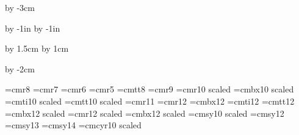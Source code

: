 











%


\enablehyperlinks[dvipdfm]


\hsize=210mm
\vsize=297mm

\parindent=0pt

\advance\vsize by -3cm

\advance\voffset by -1in
\advance\hoffset by -1in

\advance\voffset by 1.5cm
\advance\hoffset by 1cm

\advance\hsize by -2cm


{}

\font\small=cmr8
\font\Small=cmr7
\font\SMALL=cmr6
\font\tiny=cmr5
\font\smalltt=cmtt8
\font\rmnine=cmr9
\font\medium=cmr10 scaled \magstephalf
\font\mediumbx=cmbx10 scaled \magstephalf
\font\mediumit=cmti10 scaled \magstephalf
\font\mediumtt=cmtt10 scaled \magstephalf
\font\Medium=cmr11
\font\large=cmr12
\font\largebx=cmbx12
\font\largeit=cmti12
\font\largett=cmtt12
\font\Largebx=cmbx12 scaled \magstephalf
\font\huge=cmr12 scaled 
\font\hugebx=cmbx12 scaled 
\font\mediumsy=cmsy10 scaled \magstephalf
\font\largesy=cmsy12
\font\Largesy=cmsy13
\font\LARGEsy=cmsy14 
\font\mediumcy=cmcyr10 scaled \magstephalf

